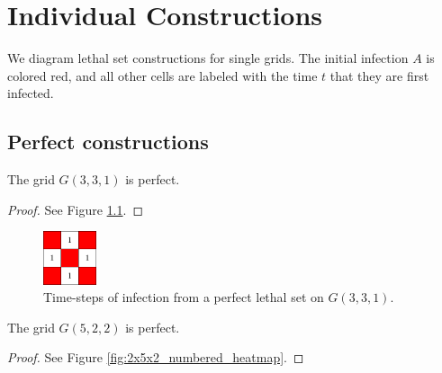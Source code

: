 \appendix
\chapter{Individual Constructions}

We diagram lethal set constructions for single grids. The initial infection $A$ is colored red, and all other cells are labeled with the time $t$ that they are first infected. 

\section{Perfect constructions}

\begin{con}
\label{con:3x3x1}
The grid $G(3,3,1)$ is perfect.
\end{con}

\begin{proof}
See Figure \ref{fig:3x3x1_numbered_heatmap}.
\end{proof}

\begin{figure}[H]
\centering
\includegraphics[width=0.14\textwidth]{figures/A/3x3x1_numbered_heatmap.pdf}
\caption{Time-steps of infection from a perfect lethal set on $G(3,3,1)$.}
\label{fig:3x3x1_numbered_heatmap}
\end{figure}




\begin{con}
\label{con:5x2x2}
The grid $G(5,2,2)$ is perfect.
\end{con}

\begin{proof}
See Figure \ref{fig:2x5x2_numbered_heatmap}.
\end{proof}

